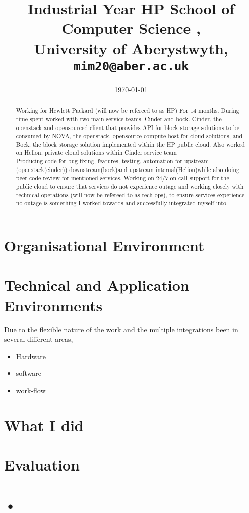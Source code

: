 \documentclass[11pt,a4paper]{report}
\begin{document}
\title{Industrial Year HP School of Computer Science ,\\ University of Aberystwyth,\\ \texttt{mim20@aber.ac.uk}} \date{\today}
\maketitle

\begin{abstract} 

Working for Hewlett Packard (will now be refereed to as HP) For 14 months. During time spent worked with two main service teams. Cinder and bock. Cinder, the openstack and opensourced client that provides API for block storage solutions to be consumed by NOVA, the openstack, opensource compute host for cloud solutions, and Bock, the block storage solution implemented within the HP public cloud. Also worked on Helion, private cloud solutions within Cinder service team\\ 
Producing code for bug fixing, features, testing, automation for upstream (openstack(cinder)) downstream(bock)and upstream internal(Helion)while also doing peer code review for mentioned services. 
Working on 24/7 on call support for the public cloud to ensure that services do not experience outage and working closely with technical operations (will now be refereed to as tech ops), to ensure services experience no outage is something I worked towards and successfully integrated myself into.

\end{abstract}


\section{Organisational Environment}
 


\section{Technical and Application Environments}
Due to the flexible nature of the work and the multiple integrations  been in several different areas, 
\begin{itemize}
\item Hardware
\item software
\item work-flow
\end{itemize} 




\section{What I did}



\section{Evaluation}



\section{•}
\end{document}
